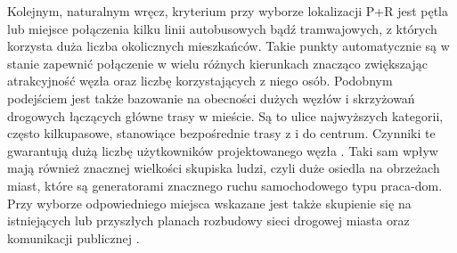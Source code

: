 \documentclass[twoside,12pt]{article}
\begin{document}
	Kolejnym, naturalnym wręcz, kryterium przy wyborze lokalizacji P+R jest pętla lub miejsce połączenia kilku linii autobusowych bądź tramwajowych, z których korzysta duża liczba okolicznych mieszkańców. Takie punkty automatycznie są w stanie zapewnić połączenie w wielu różnych kierunkach znacząco zwiększając atrakcyjność węzła oraz liczbę korzystających z niego osób. Podobnym podejściem jest także bazowanie na obecności dużych węzłów i skrzyżowań drogowych łączących główne trasy w mieście. Są to ulice najwyższych kategorii, często kilkupasowe, stanowiące bezpośrednie trasy z i do centrum. Czynniki te gwarantują dużą liczbę użytkowników projektowanego węzła \pnr{}. Taki sam wpływ mają również znacznej wielkości skupiska ludzi, czyli duże osiedla na obrzeżach miast, które są generatorami znacznego ruchu samochodowego typu praca-dom. Przy wyborze odpowiedniego miejsca wskazane jest także skupienie się na istniejących lub przyszłych planach rozbudowy sieci drogowej miasta oraz komunikacji publicznej \cite{guide}. 
	
\end{document}
